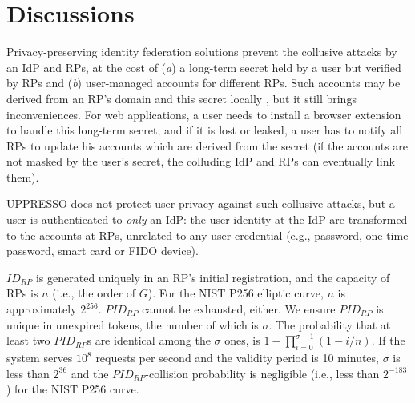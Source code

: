 \section{Discussions}
\label{sec:discussion}

Privacy-preserving identity federation solutions \cite{ELPASSO,UnlimitID,idemix,PseudoID,Opaak,uprov}
 prevent the collusive attacks by an IdP and RPs,
    at the cost of (\emph{a}) a long-term secret held by a user but verified by RPs
        and (\emph{b}) user-managed accounts \cite{PseudoID} for different RPs.
Such accounts may be derived from an RP's domain and this secret locally \cite{ELPASSO,UnlimitID,Opaak,uprov,idemix},
  but it still brings inconveniences.
For web applications, a user needs to install a browser extension to handle this long-term secret;
  and if it is lost or leaked,
       a user has to notify all RPs to update his accounts which are derived from the secret
        (if the accounts are not masked by the user's secret, the colluding IdP and RPs can eventually link them).

UPPRESSO does not protect user privacy against such collusive attacks,
    but a user is authenticated to \emph{only} an IdP:
         the user identity at the IdP
                are transformed to the accounts at RPs, unrelated to any user credential
                 (e.g., password, one-time password, smart card or FIDO device).




\vspace{0.75mm}
$ID_{RP}$ is generated uniquely in an RP's initial registration,
    and the capacity of RPs is $n$ (i.e., the order of $G$). For the NIST P256 elliptic curve, $n$ is approximately $2^{256}$.
$PID_{RP}$ cannot be exhausted, either.
We ensure $PID_{RP}$ is unique in unexpired tokens,
    the number of which is $\sigma$.
The probability that at least two $PID_{RP}$s are identical among the $\sigma$ ones,
    is $1-\prod_{i=0}^{\sigma-1}(1-i/n)$.
If the system serves $10^{8}$ requests per second and the validity period is 10 minutes,
     $\sigma$ is less than $2^{36}$ and the $PID_{RP}$-collision probability is negligible (i.e., less than $2^{-183}$)
      for the NIST P256 curve.


